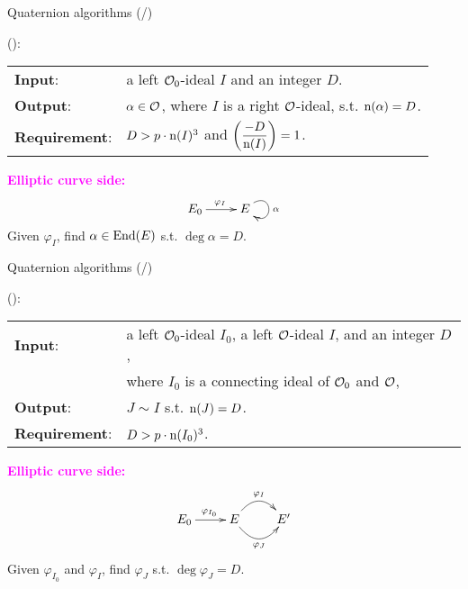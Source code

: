 \begin{frame}{Quaternion algorithms (/\algquatotal{})}

    {\large
    }
    (\cite{EC:DLLW23}):\\[5pt]
    \begin{tabular}{l l}
        \textbf{Input}: & a left $\mathcal{O}_0$-ideal $I$ and an integer $D$.\\[3pt]
        \textbf{Output}: & $\alpha \in \mathcal{O}$, where $I$ is a right $\mathcal{O}$-ideal,
                            s.t. $\mathrm{n}(\alpha) = D$.\\[3pt]
        \textbf{Requirement}: & 
                $D > p\cdot\mathrm{n}(I)^3$ and $\displaystyle \left(\frac{-D}{\mathrm{n}(I)}\right) = 1$.
    \end{tabular}

    \vspace{15pt}
    \textcolor{magenta}{\textbf{Elliptic curve side:}}
    \begin{align*}
        \xymatrix{
            E_0 \ar[r]^{\varphi_I} & E \ar@(ur,dr)[]^{\alpha}
        }
    \end{align*}
    Given $\varphi_I$,
    find $\alpha \in \mathrm{End}(E)$ s.t. $\deg\alpha = D$.
\end{frame}

\begin{frame}{Quaternion algorithms (/\algquatotal{})}

    {\large
    }
    (\cite{AC:DKLPW20}):\\[5pt]
    \begin{tabular}{l l}
        \textbf{Input}: & a left $\mathcal{O}_0$-ideal $I_0$,
                a left $\mathcal{O}$-ideal $I$, and an integer $D$,\\[2pt]
                & where $I_0$ is a connecting ideal of $\mathcal{O}_0$ and $\mathcal{O}$,\\[3pt]
        \textbf{Output}: & $J \sim I$ s.t. $\mathrm{n}(J) = D$.\\[3pt]
        \textbf{Requirement}: & 
                $D > p\cdot\mathrm{n}(I_0)^3$.
    \end{tabular}

    \vspace{15pt}
    \textcolor{magenta}{\textbf{Elliptic curve side:}}
    \begin{align*}
        \xymatrix{
            E_0 \ar[r]^{\varphi_{I_0}}
                & E \ar@/^15pt/[r]^{\varphi_I} \ar@/_15pt/[r]_{\varphi_J}
                & E'
        }
    \end{align*}
    Given $\varphi_{I_0}$ and $\varphi_I$,
    find $\varphi_J$ s.t. $\deg\varphi_J = D$.
\end{frame}

